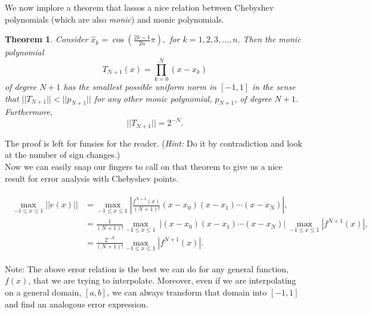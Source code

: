 \documentclass[paper=a4, fontsize=11pt]{scrartcl} %
\newtheorem{theorem}{Theorem}
\numberwithin{equation}{section} %
\numberwithin{figure}{section} %
\numberwithin{table}{section} %
\begin{document}
We now implore a theorem that lassos a nice relation between Chebyshev polynomials (which are also \emph{monic}) and monic polynomials. 

\begin{theorem}
Consider $\hat{x}_k = \cos\left( \frac{2k-1}{2n} \pi\right),$ for $k=1,2,3,\ldots,n.$ Then the monic polynomial $$T_{N+1}(x) = \prod_{k=0}^{N} (x-\hat{x}_k)$$ of degree $N+1$ has the smallest possible uniform norm in $[-1,1]$ in the sense that $||T_{N+1}|| < ||p_{N+1}||$ for any other monic polynomial, $p_{N+1}$, of degree $N+1$. Furthermore, $$||T_{N+1}|| = 2^{-N}.$$
\end{theorem}

The proof is left for funsies for the reader. (\emph{Hint:} Do it by contradiction and look at the number of sign changes.)\\

Now we can easily snap our fingers to call on that theorem to give us a nice result for error analysis with Chebyshev points. 

\begin{align}
\nonumber
\begin{split}
\max_{-1\leq x\leq 1} ||e(x)|| &=\max_{-1\leq x\leq 1} \left|   \frac{ f^{N+1}(x) }{(N+1)!} (x-x_0)(x-x_1)\cdots (x-x_N)   \right|,  \\
&= \frac{1}{(N+1)!} \max_{-1\leq x\leq 1}\ |(x-x_0)(x-x_1)\cdots (x-x_N)|\  \max_{-1\leq x\leq 1} | f^{N+1}(x) |, \\
&= \frac{2^{-N}}{(N+1)!}  \max_{-1\leq x\leq 1} | f^{N+1}(x) |.
\end{split}
\end{align}

Note: The above error relation is the best we can do for any general function, $f(x)$, that we are trying to interpolate. Moreover, even if we are interpolating on a general domain, $[a,b]$, we can always transform that domain into $[-1,1]$ and find an analogous error expression. 
\end{document}
